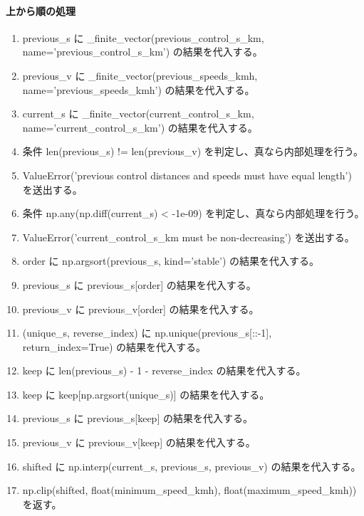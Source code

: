 \documentclass[a4paper,11pt]{article}
\begin{document}
            \paragraph{上から順の処理}
            \begin{enumerate}[leftmargin=1.8em]
            \item previous\_s に \_finite\_vector(previous\_control\_s\_km, name='previous\_control\_s\_km') の結果を代入する。
\item previous\_v に \_finite\_vector(previous\_speeds\_kmh, name='previous\_speeds\_kmh') の結果を代入する。
\item current\_s に \_finite\_vector(current\_control\_s\_km, name='current\_control\_s\_km') の結果を代入する。
\item 条件 len(previous\_s) != len(previous\_v) を判定し、真なら内部処理を行う。
\item   ValueError('previous control distances and speeds must have equal length') を送出する。
\item 条件 np.any(np.diff(current\_s) < -1e-09) を判定し、真なら内部処理を行う。
\item   ValueError('current\_control\_s\_km must be non-decreasing') を送出する。
\item order に np.argsort(previous\_s, kind='stable') の結果を代入する。
\item previous\_s に previous\_s[order] の結果を代入する。
\item previous\_v に previous\_v[order] の結果を代入する。
\item (unique\_s, reverse\_index) に np.unique(previous\_s[::-1], return\_index=True) の結果を代入する。
\item keep に len(previous\_s) - 1 - reverse\_index の結果を代入する。
\item keep に keep[np.argsort(unique\_s)] の結果を代入する。
\item previous\_s に previous\_s[keep] の結果を代入する。
\item previous\_v に previous\_v[keep] の結果を代入する。
\item shifted に np.interp(current\_s, previous\_s, previous\_v) の結果を代入する。
\item np.clip(shifted, float(minimum\_speed\_kmh), float(maximum\_speed\_kmh)) を返す。
            \end{enumerate}
\end{document}

